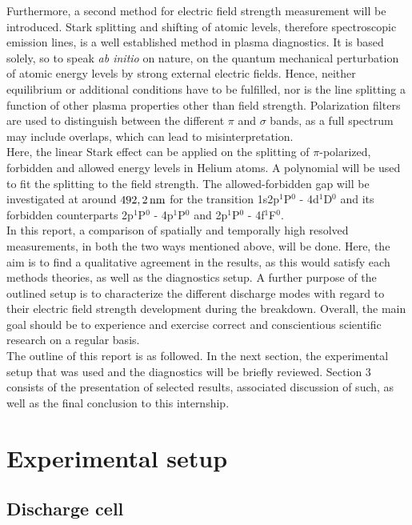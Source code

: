 \documentclass[a4paper,10pt,twoside]{article}
\newcommand{\tilt}[1]{\textit{#1}}
\begin{document}
		Furthermore, a second method for electric field \linebreak strength measurement will be introduced. Stark splitting and shifting of atomic levels, therefore spectroscopic emission lines, is a well established method in plasma diagnostics. It is based solely, so to speak \tilt{ab initio} on nature, on the quantum mechanical perturbation of atomic energy levels by strong external electric fields. Hence, neither equilibrium or additional conditions have to be fulfilled, nor is the line splitting a function of other plasma properties other than field strength. Polarization filters are used to distinguish between the different $\pi$ and $\sigma$ bands, as a full spectrum may include overlaps, which can lead to misinterpretation.\\
		Here, the linear Stark effect can be applied on the splitting of $\pi$-polarized, forbidden and allowed energy levels in Helium atoms. A polynomial will be used to fit the splitting to the field strength. The allowed-forbidden gap will be investigated at around $\unit[492,2]{nm}$ for the transition 1s2p$^1$P$^0$ - 4d$^1$D$^0$ and its forbidden counterparts 2p$^1$P$^0$ - 4p$^1$P$^0$ and 2p$^1$P$^0$ - 4f$^1$F$^0$.\\
		In this report, a comparison of spatially and temporally high resolved measurements, in both the two ways mentioned above, will be done. Here, the aim is to find a qualitative agreement in the results, as this would satisfy each methods theories, as well as the diagnostics setup. A further purpose of the outlined setup is to characterize the different discharge modes with regard to their electric field strength development during the breakdown. Overall, the main goal should be to experience and exercise correct and conscientious scientific research on a regular basis.\\
		The outline of this report is as followed. In the next section, the experimental setup that was used and the diagnostics will be briefly reviewed. Section 3 consists of the presentation of selected results, associated discussion of such, as well as the final conclusion to this internship.

	\section{Experimental setup}
	
		\subsection{Discharge cell}
		
\end{document}

